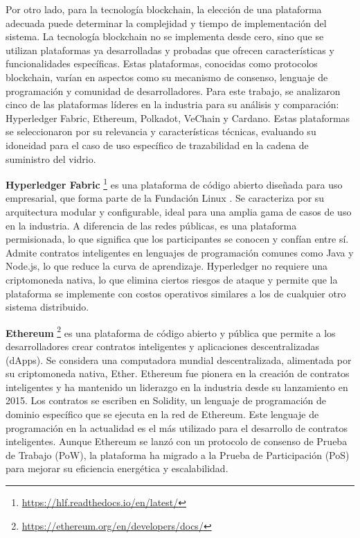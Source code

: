 Por otro lado, para la tecnología blockchain, la elección de una plataforma adecuada puede determinar la complejidad y tiempo de implementación del sistema.  La tecnología blockchain no se implementa desde cero, sino que se utilizan plataformas ya desarrolladas y probadas que ofrecen características y funcionalidades específicas. Estas plataformas, conocidas como protocolos blockchain, varían en aspectos como su mecanismo de consenso, lenguaje de programación y comunidad de desarrolladores. Para este trabajo, se analizaron cinco de las plataformas líderes en la industria para su análisis y comparación: Hyperledger Fabric, Ethereum, Polkadot, VeChain y Cardano. Estas plataformas se seleccionaron por su relevancia y características técnicas, evaluando su idoneidad para el caso de uso específico de trazabilidad en la cadena de suministro del vidrio.

\textbf{Hyperledger Fabric} \footnote{\url{https://hlf.readthedocs.io/en/latest/}}
es una plataforma de código abierto diseñada para uso empresarial, que forma parte de la Fundación Linux \cite{androulaki2018hyperledger}. Se caracteriza por su arquitectura modular y configurable, ideal para una amplia gama de casos de uso en la industria. A diferencia de las redes públicas, es una plataforma permisionada, lo que significa que los participantes se conocen y confían entre sí. Admite contratos inteligentes en lenguajes de programación comunes como Java y Node.js, lo que reduce la curva de aprendizaje. Hyperledger no requiere una criptomoneda nativa, lo que elimina ciertos riesgos de ataque y permite que la plataforma se implemente con costos operativos similares a los de cualquier otro sistema distribuido.

\textbf{Ethereum} \footnote{\url{https://ethereum.org/en/developers/docs/}}
es una plataforma de código abierto y pública que permite a los desarrolladores crear contratos inteligentes y aplicaciones descentralizadas (dApps). Se considera una computadora mundial descentralizada, alimentada por su criptomoneda nativa, Ether. Ethereum fue pionera en la creación de contratos inteligentes y ha mantenido un liderazgo en la industria desde su lanzamiento en 2015. Los contratos se escriben en Solidity, un lenguaje de programación de dominio específico que se ejecuta en la red de Ethereum. Este lenguaje de programación en la actualidad es el más utilizado para el desarrollo de contratos inteligentes. Aunque Ethereum se lanzó con un protocolo de consenso de Prueba de Trabajo (PoW), la plataforma ha migrado a la Prueba de Participación (PoS) para mejorar su eficiencia energética y escalabilidad.

